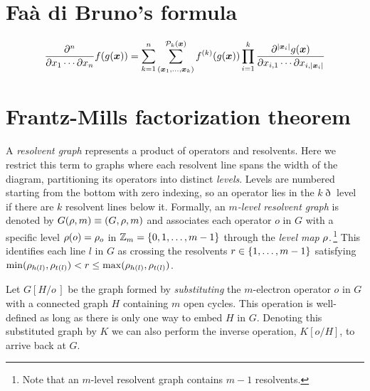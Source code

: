 \documentclass[11pt]{article}
\numberwithin{equation}{section}
\begin{document}
\appendix
\section{Fa\`a di Bruno's formula}

\begin{thm}
\begin{align}
  \pd{^n}{x_1\cd \pt x_n}
  f(g(\bm{x}))
=
  \sum_{k=1}^n
  \sum_{(\bm{x}_1,\ld,\bm{x}_k)}^{\mc{P}_k(\bm{x})}
  f\ord{k}(g(\bm{x}))
  \prod_{i=1}^k
  \pd{
    ^{|\bm{x}_i|}
    g(\bm{x})
  }{
    x_{i,1}
  \cd
    \pt
    x_{i,|\bm{x}_i|}
  }
\end{align}
\end{thm}



\section{Frantz-Mills factorization theorem}

\begin{dfn}
\label{dfn:resolvent-graph}
A \textit{resolvent graph} represents a product of operators and resolvents.
Here we restrict this term to graphs where each resolvent line spans the width of the diagram, partitioning its operators into distinct \textit{levels}.
Levels are numbered starting from the bottom with zero indexing, so an operator lies in the $k\eth$ level if there are $k$ resolvent lines below it.
Formally, an \textit{$m$-level resolvent graph} is denoted by $G(\rho ,m)\equiv(G,\rho ,m)$ and associates each operator $o$ in $G$ with a specific level $\rho (o)=\rho _o$ in $\mathbb{Z}_m=\{0,1,\ldots,m-1\}$ through the \textit{level map} $\rho $.\,\footnote{
  Note that an $m$-level resolvent graph contains $m-1$ resolvents.
}
This identifies each line $l$ in $G$ as crossing the resolvents
$
  r
\in
  \{1,\ldots,m-1\}
$
satisfying
$
  \mathrm{min}(\rho _{h(l)},\rho _{t(l)})
<
  r
\leq
  \mathrm{max}(\rho _{h(l)},\rho _{t(l)})
$.
\end{dfn}


\begin{dfn}
Let $G[H/o\,]$ be the graph formed by \textit{substituting} the $m$-electron operator $o$ in $G$ with a connected graph $H$ containing $m$ open cycles.
This operation is well-defined as long as there is only one way to embed $H$ in $G$.
Denoting this substituted graph by $K$ we can also perform the inverse operation, $K[o/H]$, to arrive back at $G$.
\end{dfn}
\end{document}
